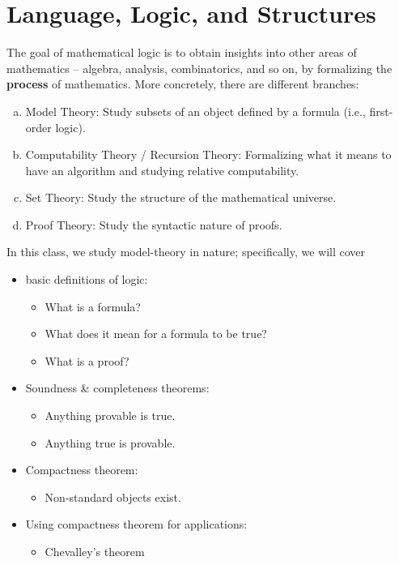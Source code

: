 \chapter{Language, Logic, and Structures}
The goal of mathematical logic is to obtain insights into other areas of mathematics -- algebra, analysis, combinatorics, and so on, by formalizing the \textbf{process} of mathematics. More concretely, there are different branches:
\begin{enumerate}[(a)]
	\item Model Theory: Study subsets of an object defined by a formula (i.e., first-order logic).
	\item Computability Theory / Recursion Theory: Formalizing what it means to have an algorithm and studying relative computability.
	\item Set Theory: Study the structure of the mathematical universe.
	\item Proof Theory: Study the syntactic nature of proofs.
\end{enumerate}

In this class, we study model-theory in nature; specifically, we will cover
\begin{itemize}
	\item basic definitions of logic:
	      \begin{itemize}
		      \item What is a formula?
		      \item What does it mean for a formula to be true?
		      \item What is a proof?
	      \end{itemize}
	\item Soundness \& completeness theorems:
	      \begin{itemize}
		      \item Anything provable is true.
		      \item Anything true is provable.
	      \end{itemize}
	\item Compactness theorem:
	      \begin{itemize}
		      \item Non-standard objects exist.
	      \end{itemize}
	\item Using compactness theorem for applications:
	      \begin{itemize}
		      \item Chevalley's theorem
	      \end{itemize}
\end{itemize}

